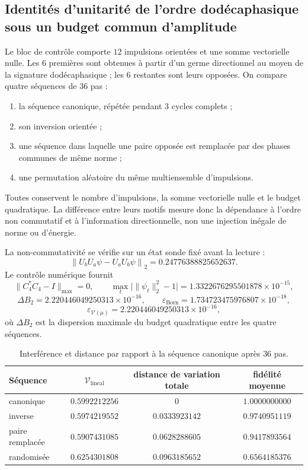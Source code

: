\subsection{Identités d'unitarité de l'ordre dodécaphasique sous un budget commun d'amplitude}

Le bloc de contrôle comporte \(12\) impulsions orientées et une somme vectorielle nulle.
Les \(6\) premières sont obtenues à partir d'un germe directionnel au moyen de la signature
dodécaphasique ; les \(6\) restantes sont leurs opposées. On compare quatre
séquences de \(36\) pas :
\begin{enumerate}
 \item la séquence canonique, répétée pendant \(3\) cycles complets ;
 \item son inversion orientée ;
 \item une séquence dans laquelle une paire opposée est remplacée par des phases communes
       de même norme ;
 \item une permutation aléatoire du même multiensemble d'impulsions.
\end{enumerate}
Toutes conservent le nombre d'impulsions, la somme vectorielle nulle et le budget
quadratique. La différence entre leurs motifs mesure donc la dépendance
à l'ordre non commutatif et à l'information directionnelle, non une
injection inégale de norme ou d'énergie.

La non-commutativité se vérifie sur un état sonde fixé avant la
lecture :
\[
 \left\|U_bU_a\psi-U_aU_b\psi\right\|_2
 =0.24776388825652637.
\]
Le contrôle numérique fournit
\[
 \|C_4^*C_4-I\|_{\max}=0,
 \qquad
 \max_t\bigl|\|\psi_t\|_2^2-1\bigr|
 =1.3322676295501878\times10^{-15},
\]
\[
 \Delta B_2=2.220446049250313\times10^{-16},
 \qquad
 \varepsilon_{\mathrm{Born}}
 =1.734723475976807\times10^{-18},
\]
\[
 \varepsilon_{\mathcal V(\mu)}
 =2.220446049250313\times10^{-16},
\]
où \(\Delta B_2\) est la dispersion maximale du budget quadratique entre
les quatre séquences.

\begin{table}[tbp]
\centering
\caption{Interférence et distance par rapport à la séquence canonique après \(36\) pas.}
\label{tab:md-sucesora-interferometro-resultados}
\begin{tabular}{lccc}
\toprule
Séquence & \(\mathcal V_{\mathrm{lineal}}\) &
distance de variation totale & fidélité moyenne \\
\midrule
canonique      & \(0.5992212256\) & \(0\)            & \(1.0000000000\) \\
inverse       & \(0.5974219552\) & \(0.0333923142\) & \(0.9740951119\) \\
paire remplacée& \(0.5907431085\) & \(0.0628288605\) & \(0.9417893564\) \\
randomisée  & \(0.6254301808\) & \(0.0963185652\) & \(0.6564185376\) \\
\bottomrule
\end{tabular}
\end{table}

